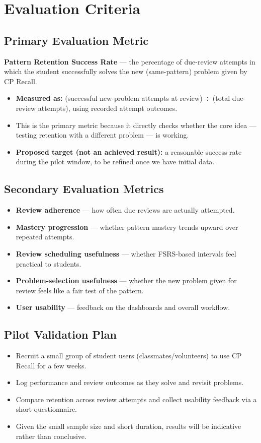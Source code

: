 \documentclass[11pt,a4paper]{article}
\begin{document}
\section{Evaluation Criteria}
\subsection{Primary Evaluation Metric}
\textbf{Pattern Retention Success Rate} --- the percentage of due-review attempts in which the student successfully solves the new (same-pattern) problem given by CP Recall.
\begin{itemize}[leftmargin=0.7cm]
\item \textbf{Measured as:} (successful new-problem attempts at review) $\div$ (total due-review attempts), using recorded attempt outcomes.
\item This is the primary metric because it directly checks whether the core idea --- testing retention with a different problem --- is working.
\item \textbf{Proposed target (not an achieved result):} a reasonable success rate during the pilot window, to be refined once we have initial data.
\end{itemize}

\subsection{Secondary Evaluation Metrics}
\begin{itemize}[leftmargin=0.7cm]
\item \textbf{Review adherence} --- how often due reviews are actually attempted.
\item \textbf{Mastery progression} --- whether pattern mastery trends upward over repeated attempts.
\item \textbf{Review scheduling usefulness} --- whether FSRS-based intervals feel practical to students.
\item \textbf{Problem-selection usefulness} --- whether the new problem given for review feels like a fair test of the pattern.
\item \textbf{User usability} --- feedback on the dashboards and overall workflow.
\end{itemize}

\subsection{Pilot Validation Plan}
\begin{itemize}[leftmargin=0.7cm]
\item Recruit a small group of student users (classmates/volunteers) to use CP Recall for a few weeks.
\item Log performance and review outcomes as they solve and revisit problems.
\item Compare retention across review attempts and collect usability feedback via a short questionnaire.
\item Given the small sample size and short duration, results will be indicative rather than conclusive.
\end{itemize}
\end{document}
